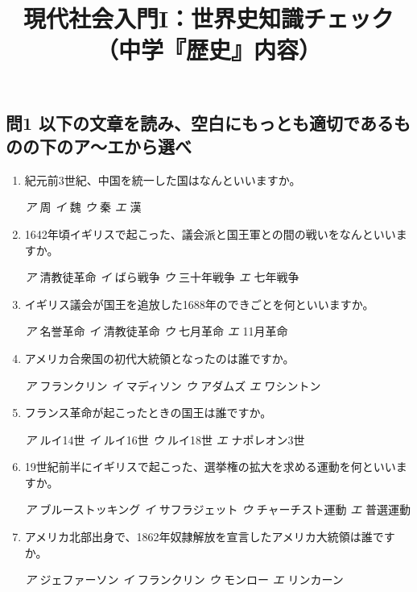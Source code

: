 \documentclass[dvipdfmx]{jsarticle}
\title{現代社会入門I：世界史知識チェック（中学『歴史』内容）}
\newcommand{\sentakusi}[4]{
\hspace{.3zw}
\emph{ア}\hspace{1zw} #1 \hspace{2zw} \emph{イ} \hspace{1zw}#2 \hspace{2zw}\emph{ウ}\hspace{1zw} #3 \hspace{2zw}\emph{エ}\hspace{1zw} #4

}
\begin{document}
\maketitle

\subsection*{問1 以下の文章を読み、空白にもっとも適切であるものの下のア〜エから選べ}


\begin{enumerate}

\setlength{\parskip}{.8zw}
\setlength{\itemsep}{.8zw}



\item 紀元前3世紀、中国を統一した国はなんといいますか。

\sentakusi{周}{魏}{秦}{漢}

\item 1642年頃イギリスで起こった、議会派と国王軍との間の戦いをなんといいますか。

\sentakusi{清教徒革命}{ばら戦争}{三十年戦争}{七年戦争}


\item イギリス議会が国王を追放した1688年のできごとを何といいますか。

\sentakusi{名誉革命}{清教徒革命}{七月革命}{11月革命}


\item アメリカ合衆国の初代大統領となったのは誰ですか。

\sentakusi{フランクリン}{マディソン}{アダムズ}{ワシントン}



\item フランス革命が起こったときの国王は誰ですか。

\sentakusi{ルイ14世}{ルイ16世}{ルイ18世}{ナポレオン3世}


\item 19世紀前半にイギリスで起こった、選挙権の拡大を求める運動を何といいますか。

\sentakusi{ブルーストッキング}{サフラジェット}{チャーチスト運動}{普選運動}



\item アメリカ北部出身で、1862年奴隷解放を宣言したアメリカ大統領は誰ですか。

\sentakusi{ジェファーソン}{フランクリン}{モンロー}{リンカーン}






\end{enumerate}
\end{document}

